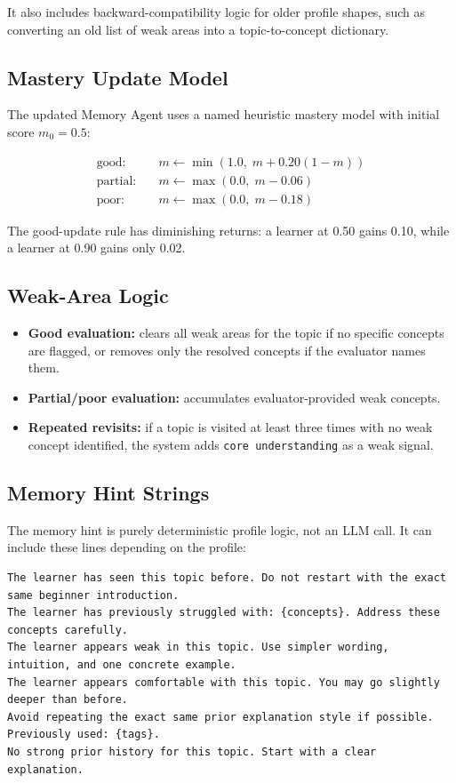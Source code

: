 \documentclass[11pt,a4paper]{article}
\begin{document}
It also includes backward-compatibility logic for older profile shapes, such as converting an old list of weak areas into a topic-to-concept dictionary.

\subsection{Mastery Update Model}

The updated Memory Agent uses a named heuristic mastery model with initial score $m_0=0.5$:

\begin{align}
\text{good:}\quad & m \leftarrow \min(1.0,\; m + 0.20(1-m)) \\
\text{partial:}\quad & m \leftarrow \max(0.0,\; m - 0.06) \\
\text{poor:}\quad & m \leftarrow \max(0.0,\; m - 0.18)
\end{align}

The good-update rule has diminishing returns: a learner at 0.50 gains 0.10, while a learner at 0.90 gains only 0.02.

\subsection{Weak-Area Logic}

\begin{itemize}
    \item \textbf{Good evaluation:} clears all weak areas for the topic if no specific concepts are flagged, or removes only the resolved concepts if the evaluator names them.
    \item \textbf{Partial/poor evaluation:} accumulates evaluator-provided weak concepts.
    \item \textbf{Repeated revisits:} if a topic is visited at least three times with no weak concept identified, the system adds \texttt{core understanding} as a weak signal.
\end{itemize}

\subsection{Memory Hint Strings}

The memory hint is purely deterministic profile logic, not an LLM call. It can include these lines depending on the profile:

\begin{lstlisting}
The learner has seen this topic before. Do not restart with the exact same beginner introduction.
The learner has previously struggled with: {concepts}. Address these concepts carefully.
The learner appears weak in this topic. Use simpler wording, intuition, and one concrete example.
The learner appears comfortable with this topic. You may go slightly deeper than before.
Avoid repeating the exact same prior explanation style if possible. Previously used: {tags}.
No strong prior history for this topic. Start with a clear explanation.
\end{lstlisting}
\end{document}
